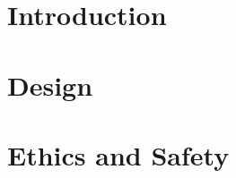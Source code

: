 \documentclass[12pt]{article}
\begin{document}

\clearpage
\section{Introduction}
\section{Design}
\section{Ethics and Safety}

\printbibliography[heading=bibintoc]
\clearpage
\end{document}
